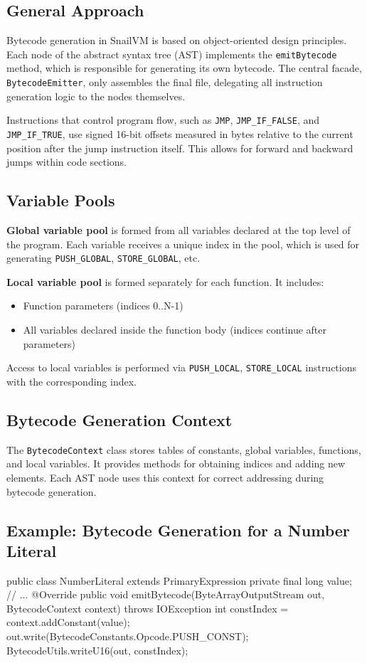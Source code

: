 \documentclass[a4paper,12pt]{article}
\begin{document}
\subsection{General Approach}
  Bytecode generation in SnailVM is based on object-oriented design principles. Each node of the abstract syntax tree (AST) implements the \texttt{emitBytecode} method, which is responsible for generating its own bytecode. The central facade, \texttt{BytecodeEmitter}, only assembles the final file, delegating all instruction generation logic to the nodes themselves.

  Instructions that control program flow, such as \texttt{JMP}, \texttt{JMP\_IF\_FALSE}, and \texttt{JMP\_IF\_TRUE}, use signed 16-bit offsets measured in bytes relative to the current position after the jump instruction itself. This allows for forward and backward jumps within code sections.

\subsection{Variable Pools}
\textbf{Global variable pool} is formed from all variables declared at the top level of the program. Each variable receives a unique index in the pool, which is used for generating \texttt{PUSH\_GLOBAL}, \texttt{STORE\_GLOBAL}, etc.

\textbf{Local variable pool} is formed separately for each function. It includes:
\begin{itemize}
\item Function parameters (indices 0..N-1)
\item All variables declared inside the function body (indices continue after parameters)
\end{itemize}
  Access to local variables is performed via \texttt{PUSH\_LOCAL}, \texttt{STORE\_LOCAL} instructions with the corresponding index.

\subsection{Bytecode Generation Context}
  The \texttt{BytecodeContext} class stores tables of constants, global variables, functions, and local variables. It provides methods for obtaining indices and adding new elements. Each AST node uses this context for correct addressing during bytecode generation.

\subsection{Example: Bytecode Generation for a Number Literal}
\begin{snailcode}
  public class NumberLiteral extends PrimaryExpression {
  private final long value;
  // ...
  @Override
  public void emitBytecode(ByteArrayOutputStream out, BytecodeContext context) throws IOException {
  int constIndex = context.addConstant(value);
  out.write(BytecodeConstants.Opcode.PUSH_CONST);
  BytecodeUtils.writeU16(out, constIndex);
  }
  }
\end{snailcode}
\end{document}
